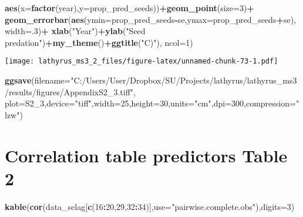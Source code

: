 \documentclass[
]{article}
\newenvironment{Shaded}{\begin{snugshade}}{\end{snugshade}}
\newcommand{\DataTypeTok}[1]{\textcolor[rgb]{0.13,0.29,0.53}{#1}}
\newcommand{\DecValTok}[1]{\textcolor[rgb]{0.00,0.00,0.81}{#1}}
\newcommand{\KeywordTok}[1]{\textcolor[rgb]{0.13,0.29,0.53}{\textbf{#1}}}
\newcommand{\NormalTok}[1]{#1}
\newcommand{\OperatorTok}[1]{\textcolor[rgb]{0.81,0.36,0.00}{\textbf{#1}}}
\newcommand{\StringTok}[1]{\textcolor[rgb]{0.31,0.60,0.02}{#1}}
\begin{document}
\begin{Shaded}
\begin{Highlighting}[]
         \KeywordTok{aes}\NormalTok{(}\DataTypeTok{x=}\KeywordTok{factor}\NormalTok{(year),}\DataTypeTok{y=}\NormalTok{prop_pred_seeds))}\OperatorTok{+}\KeywordTok{geom_point}\NormalTok{(}\DataTypeTok{size=}\DecValTok{3}\NormalTok{)}\OperatorTok{+}
\StringTok{    }\KeywordTok{geom_errorbar}\NormalTok{(}\KeywordTok{aes}\NormalTok{(}\DataTypeTok{ymin=}\NormalTok{prop_pred_seeds}\OperatorTok{-}\NormalTok{se,}\DataTypeTok{ymax=}\NormalTok{prop_pred_seeds}\OperatorTok{+}\NormalTok{se), }\DataTypeTok{width=}\NormalTok{.}\DecValTok{3}\NormalTok{)}\OperatorTok{+}
\StringTok{    }\KeywordTok{xlab}\NormalTok{(}\StringTok{"Year"}\NormalTok{)}\OperatorTok{+}\KeywordTok{ylab}\NormalTok{(}\StringTok{"Seed predation"}\NormalTok{)}\OperatorTok{+}\KeywordTok{my_theme}\NormalTok{()}\OperatorTok{+}\KeywordTok{ggtitle}\NormalTok{(}\StringTok{"C)"}\NormalTok{),}
  \DataTypeTok{ncol=}\DecValTok{1}\NormalTok{)}
\end{Highlighting}
\end{Shaded}

\texttt{[image: lathyrus\_ms3\_2\_files/figure-latex/unnamed-chunk-73-1.pdf]}

\begin{Shaded}
\begin{Highlighting}[]
\KeywordTok{ggsave}\NormalTok{(}\DataTypeTok{filename=}\StringTok{"C:/Users/User/Dropbox/SU/Projects/lathyrus/lathyrus_ms3/results/figures/AppendixS2_3.tiff"}\NormalTok{,}
       \DataTypeTok{plot=}\NormalTok{S2_}\DecValTok{3}\NormalTok{,}\DataTypeTok{device=}\StringTok{"tiff"}\NormalTok{,}\DataTypeTok{width=}\DecValTok{25}\NormalTok{,}\DataTypeTok{height=}\DecValTok{30}\NormalTok{,}\DataTypeTok{units=}\StringTok{"cm"}\NormalTok{,}\DataTypeTok{dpi=}\DecValTok{300}\NormalTok{,}\DataTypeTok{compression=}\StringTok{"lzw"}\NormalTok{)}
\end{Highlighting}
\end{Shaded}

\hypertarget{correlation-table-predictors-table-2}{%
\section{Correlation table predictors Table
2}\label{correlation-table-predictors-table-2}}

\begin{Shaded}
\begin{Highlighting}[]
\KeywordTok{kable}\NormalTok{(}\KeywordTok{cor}\NormalTok{(data_selag[}\KeywordTok{c}\NormalTok{(}\DecValTok{16}\OperatorTok{:}\DecValTok{20}\NormalTok{,}\DecValTok{29}\NormalTok{,}\DecValTok{32}\OperatorTok{:}\DecValTok{34}\NormalTok{)],}\DataTypeTok{use=}\StringTok{"pairwise.complete.obs"}\NormalTok{),}\DataTypeTok{digits=}\DecValTok{3}\NormalTok{)}
\end{Highlighting}
\end{Shaded}
\end{document}
